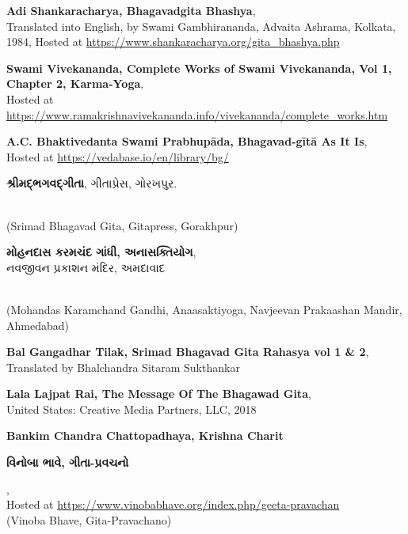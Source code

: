\documentclass[a4paper]{article}
\begin{document}
\begin{thebibliography}{99}

     {\textbf{Adi Shankaracharya, Bhagavadgita Bhashya}, 
\\Translated into English, by Swami Gambhirananda, Advaita Ashrama, Kolkata, 1984, Hosted at \href{https://www.shankaracharya.org/gita\_bhashya.php}
{https://www.shankaracharya.org/gita\_bhashya.php}}

 {\textbf{Swami Vivekananda, Complete Works of Swami Vivekananda, Vol 1, Chapter 2, Karma-Yoga}, 
\\Hosted at \href{https://www.ramakrishnavivekananda.info/vivekananda/complete\_works.htm}
{https://www.ramakrishnavivekananda.info/vivekananda/complete\_works.htm}}

 {\textbf{A.C. Bhaktivedanta Swami Prabhupāda, Bhagavad-gītā As It Is}, 
\\Hosted at \href{https://vedabase.io/en/library/bg/}{https://vedabase.io/en/library/bg/}}

 {\begin{Guja}\textbf{શ્રીમદ્ભગવદ્ગીતા}, ગીતાપ્રેસ, ગોરખપુર.\end{Guja} \\
(Srimad Bhagavad Gita, Gitapress, Gorakhpur)}

 {{\begin{Guja}\textbf{મોહનદાસ કરમચંદ ગાંધી, અનાસક્તિયોગ}, 
\\નવજીવન પ્રકાશન મંદિર, અમદાવાદ\end{Guja}} 
\\(Mohandas Karamchand Gandhi, Anaasaktiyoga, Navjeevan Prakaashan Mandir, Ahmedabad)}

 {\textbf{Bal Gangadhar Tilak, Srimad Bhagavad Gita Rahasya vol 1 \& 2}, 
\\Translated by Bhalchandra Sitaram Sukthankar}

 {\textbf{Lala Lajpat Rai, The Message Of The Bhagawad Gita}, 
\\United States: Creative Media Partners, LLC, 2018}

 {\textbf{Bankim Chandra Chattopadhaya, Krishna Charit}}

 {\begin{Guja}\textbf{વિનોબા ભાવે, ગીતા-પ્રવચનો}\end{Guja}, 
\\Hosted at \href{https://www.vinobabhave.org/index.php/geeta-pravachan}{https://www.vinobabhave.org/index.php/geeta-pravachan} 
\\(Vinoba Bhave, Gita-Pravachano)
}


\end{thebibliography}
\end{document}
